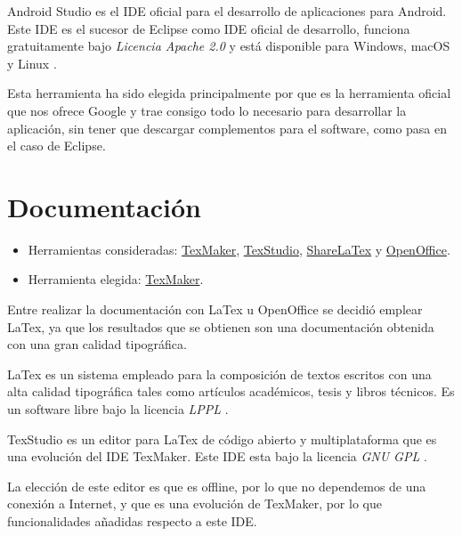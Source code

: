 Android Studio es el IDE oficial para el desarrollo de aplicaciones para Android. Este IDE es el sucesor de Eclipse como IDE oficial de desarrollo, funciona gratuitamente bajo \textit{Licencia Apache 2.0} y está disponible para Windows, macOS y Linux \cite{androidstudio:wiki}.

Esta herramienta ha sido elegida principalmente por que es la herramienta oficial que nos ofrece Google y trae consigo todo lo necesario para desarrollar la aplicación, sin tener que descargar complementos para el software, como pasa en el caso de Eclipse.

\section{Documentación}

\begin{itemize}
	\tightlist
	\item
	Herramientas consideradas: \href{http://www.xm1math.net/texmaker/}{TexMaker}, \href{https://www.texstudio.org/}{TexStudio}, \href{https://es.sharelatex.com/}{ShareLaTex} y \href{https://www.openoffice.org/es/}{OpenOffice}.
	\item
	Herramienta elegida: \href{http://www.xm1math.net/texmaker/}{TexMaker}.
\end{itemize}

Entre realizar la documentación con LaTex u OpenOffice se decidió emplear LaTex, ya que los resultados que se obtienen son una documentación obtenida con una gran calidad tipográfica.

LaTex es un sistema empleado para la composición de textos escritos con una alta calidad tipográfica tales como artículos académicos, tesis y libros técnicos. Es un software libre bajo la licencia \textit{LPPL} \cite{latex:wiki}.

TexStudio es un editor para LaTex de código abierto y multiplataforma que es una evolución del IDE TexMaker. Este IDE esta bajo la licencia \textit{GNU GPL} \cite{texstudio:wiki}.

La elección de este editor es que es offline, por lo que no dependemos de una conexión a Internet, y que es una evolución de TexMaker, por lo que funcionalidades añadidas respecto a este IDE.
